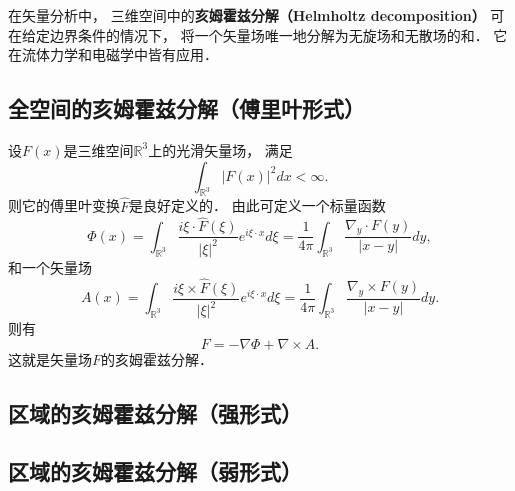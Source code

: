 


在矢量分析中， 三维空间中的\textbf{亥姆霍兹分解（Helmholtz decomposition）} 可在给定边界条件的情况下， 将一个矢量场唯一地分解为无旋场和无散场的和． 它在流体力学和电磁学中皆有应用．

\subsection{全空间的亥姆霍兹分解（傅里叶形式）}
设$F(x)$是三维空间$\mathbb{R}^3$上的光滑矢量场， 满足
$$
\int_{\mathbb{R}^3}|F(x)|^2dx<\infty.
$$
则它的傅里叶变换$\hat F$是良好定义的． 由此可定义一个标量函数
$$
\Phi(x)
=\int_{\mathbb{R}^3}\frac{i\xi\cdot\hat F(\xi)}{|\xi|^2}e^{i\xi\cdot x}d\xi
=\frac{1}{4\pi}\int_{\mathbb{R}^3}\frac{\nabla_y\cdot F(y)}{|x-y|}dy,
$$
和一个矢量场
$$
A(x)
=\int_{\mathbb{R}^3}\frac{i\xi\times\hat F(\xi)}{|\xi|^2}e^{i\xi\cdot x}d\xi
=\frac{1}{4\pi}\int_{\mathbb{R}^3}\frac{\nabla_y\times F(y)}{|x-y|}dy.
$$
则有
$$
F=-\nabla\Phi+\nabla\times A.
$$
这就是矢量场$F$的亥姆霍兹分解．

\subsection{区域的亥姆霍兹分解（强形式）}

\subsection{区域的亥姆霍兹分解（弱形式）}
